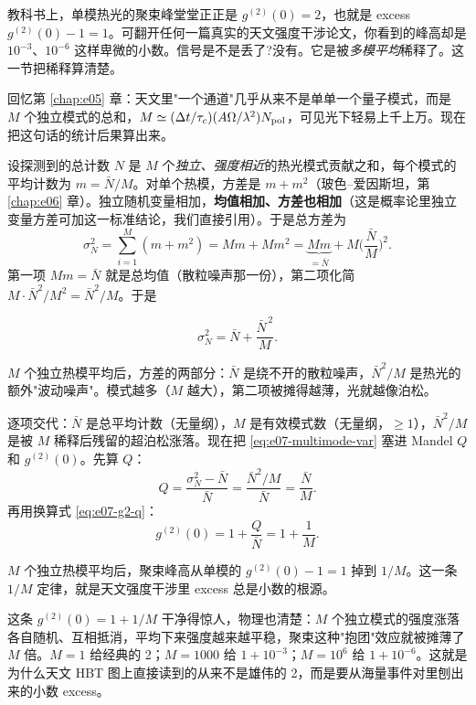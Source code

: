 教科书上，单模热光的聚束峰堂堂正正是 \(g^{(2)}(0)=2\)，也就是 excess \(g^{(2)}(0)-1=1\)。可翻开任何一篇真实的天文强度干涉论文，你看到的峰高却是 \(10^{-3}\)、\(10^{-6}\) 这样卑微的小数。信号是不是丢了?没有。它是被\emph{多模平均}稀释了。这一节把稀释算清楚。

回忆第 \ref{chap:e05} 章：天文里"一个通道"几乎从来不是单单一个量子模式，而是 \(M\) 个独立模式的总和，\(M\simeq(\Delta t/\tau_c)(A\Omega/\lambda^2)N_{\rm pol}\)，可见光下轻易上千上万。现在把这句话的统计后果算出来。

设探测到的总计数 \(N\) 是 \(M\) 个\emph{独立、强度相近}的热光模式贡献之和，每个模式的平均计数为 \(m=\bar N/M\)。对单个热模，方差是 \(m+m^2\)（玻色--爱因斯坦，第 \ref{chap:e06} 章）。独立随机变量相加，\textbf{均值相加、方差也相加}（这是概率论里独立变量方差可加这一标准结论，我们直接引用）。于是总方差为
\[
  \sigma_N^2=\sum_{i=1}^{M}(m+m^2)=M m+M m^2
  =\underbrace{Mm}_{=\bar N}+M\Big(\frac{\bar N}{M}\Big)^2 .
\]
第一项 \(Mm=\bar N\) 就是总均值（散粒噪声那一份），第二项化简 \(M\cdot\bar N^2/M^2=\bar N^2/M\)。于是

\begin{equation}
  \sigma_N^2=\bar N+\frac{\bar N^{\,2}}{M}.
  \label{eq:e07-multimode-var}
\end{equation}
\begin{formulaexplain}
\(M\) 个独立热模平均后，方差的两部分：\(\bar N\) 是绕不开的散粒噪声，\(\bar N^2/M\) 是热光的额外"波动噪声"。模式越多（\(M\) 越大），第二项被摊得越薄，光就越像泊松。
\end{formulaexplain}

逐项交代：\(\bar N\) 是总平均计数（无量纲），\(M\) 是有效模式数（无量纲，\(\ge1\)），\(\bar N^2/M\) 是被 \(M\) 稀释后残留的超泊松涨落。现在把 \eqref{eq:e07-multimode-var} 塞进 Mandel \(Q\) 和 \(g^{(2)}(0)\)。先算 \(Q\)：
\[
  Q=\frac{\sigma_N^2-\bar N}{\bar N}
  =\frac{\bar N^2/M}{\bar N}=\frac{\bar N}{M}.
\]
再用换算式 \eqref{eq:e07-g2-q}：
\begin{equation}
  g^{(2)}(0)=1+\frac{Q}{\bar N}=1+\frac{1}{M}.
  \label{eq:e07-multimode-g2}
\end{equation}
\begin{formulaexplain}
\(M\) 个独立热模平均后，聚束峰高从单模的 \(g^{(2)}(0)-1=1\) 掉到 \(1/M\)。这一条 \(1/M\) 定律，就是天文强度干涉里 excess 总是小数的根源。
\end{formulaexplain}

这条 \(g^{(2)}(0)=1+1/M\) 干净得惊人，物理也清楚：\(M\) 个独立模式的强度涨落各自随机、互相抵消，平均下来强度越来越平稳，聚束这种"抱团"效应就被摊薄了 \(M\) 倍。\(M=1\) 给经典的 2；\(M=1000\) 给 \(1+10^{-3}\)；\(M=10^6\) 给 \(1+10^{-6}\)。这就是为什么天文 HBT 图上直接读到的从来不是雄伟的 2，而是要从海量事件对里刨出来的小数 excess。

